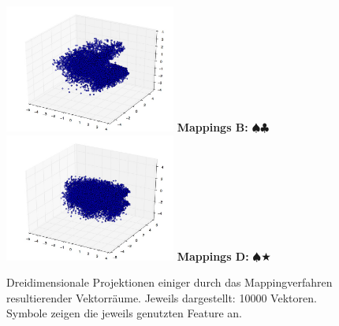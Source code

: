 \begin{itemize}
\begin{figure}[h]
\begin{multicols}{2}
    \columnbreak

    \includegraphics[width=0.5\textwidth]{../img/mappings_get10000_occ100.jpg}
    \textbf{Mappings B:} $\spadesuit\clubsuit$
    \includegraphics[width=0.5\textwidth]{../img/mappings10000_occ.jpg}
    \textbf{Mappings D:} $\spadesuit\bigstar$
  \end{multicols}

  \flushleft
  \caption[Dreidimensionale Projektionen einiger durch das Mappingverfahren resultierender Vektorräume]{Dreidimensionale
   Projektionen einiger durch das Mappingverfahren resultierender Vektorräume. Jeweils dargestellt: 10000 Vektoren.
   Symbole zeigen die jeweils genutzten Feature an. \label{fig:proj_map}}
\end{figure}

\end{itemize}

